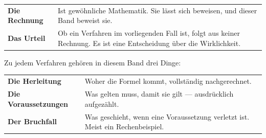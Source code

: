 \begin{merksatz}
\begin{center}
\renewcommand{\arraystretch}{1.55}
\begin{tabular}{@{}P{2.6cm}P{6.0cm}@{}}
\toprule
\textbf{Die Rechnung} & Ist gewöhnliche Mathematik. Sie lässt sich beweisen, und dieser Band beweist sie.\\
\textbf{Das Urteil} & Ob ein Verfahren im vorliegenden Fall  ist, folgt aus keiner Rechnung. Es ist eine Entscheidung über die Wirklichkeit.\\
\bottomrule
\end{tabular}
\end{center}

\begin{center}
\begin{minipage}{0.88\textwidth}
\end{minipage}
\end{center}
\end{merksatz}

\begin{warnung}
Zu jedem Verfahren gehören in diesem Band drei Dinge:

\begin{center}
\renewcommand{\arraystretch}{1.5}
\begin{tabular}{@{}P{2.4cm}P{6.2cm}@{}}
\toprule
\textbf{Die Herleitung} & Woher die Formel kommt, vollständig nachgerechnet.\\
\textbf{Die Voraussetzungen} & Was gelten muss, damit sie gilt --- ausdrücklich aufgezählt.\\
\textbf{Der Bruchfall} & Was geschieht, wenn eine Voraussetzung verletzt ist. Meist ein Rechenbeispiel.\\
\bottomrule
\end{tabular}
\end{center}

\begin{center}
\begin{minipage}{0.88\textwidth}
\end{minipage}
\end{center}
\end{warnung}


